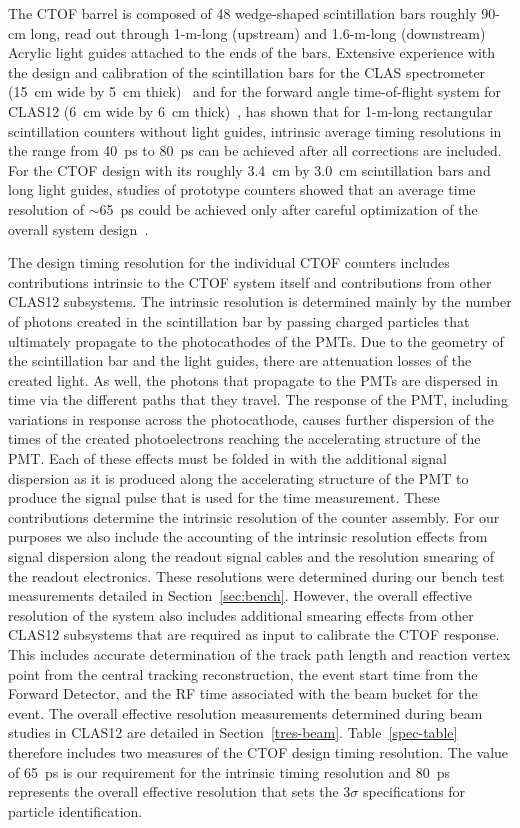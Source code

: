 \documentclass{elsart}
\begin{document}
The CTOF barrel is composed of 48 wedge-shaped scintillation bars roughly 90-cm long, read out
through 1-m-long (upstream) and 1.6-m-long (downstream) Acrylic light guides attached to the 
ends of the bars. Extensive experience with the design and calibration of the scintillation bars for 
the CLAS spectrometer (15~cm wide by 5~cm thick)~\cite{tof-nim} and for the forward angle 
time-of-flight system for CLAS12 (6~cm wide by 6~cm thick)~\cite{ftof-nim}, has shown that for 
1-m-long rectangular scintillation counters without light guides, intrinsic average timing resolutions
in the range from 40~ps to 80~ps can be achieved after all corrections are included. For the CTOF
design with its roughly 3.4~cm by 3.0~cm scintillation bars and long light guides, studies of prototype
counters showed that an average time resolution of $\sim$65~ps could be achieved only after careful
optimization of the overall system design~\cite{baturin-2009}.

The design timing resolution for the individual CTOF counters includes contributions intrinsic to the
CTOF system itself and contributions from other CLAS12 subsystems. The intrinsic resolution
is determined mainly by the number of photons created in the scintillation bar by passing charged
particles that ultimately propagate to the photocathodes of the PMTs. Due to the geometry of the
scintillation bar and the light guides, there are attenuation losses of the created light. As well, the
photons that propagate to the PMTs are dispersed in time via the different paths that they travel.
The response of the PMT, including variations in response across the photocathode, causes further
dispersion of the times of the created photoelectrons reaching the accelerating structure of the PMT.
Each of these effects must be folded in with the additional signal dispersion as it is produced along the
accelerating structure of the PMT to produce the signal pulse that is used for the time measurement.
These contributions determine the intrinsic resolution of the counter assembly. For our purposes we also
include the accounting of the intrinsic resolution effects from signal dispersion along the readout signal
cables and the resolution smearing of the readout electronics. These resolutions were determined during
our bench test measurements detailed in Section~\ref{sec:bench}. However, the overall effective resolution
of the system also includes additional smearing effects from other CLAS12 subsystems that are required
as input to calibrate the CTOF response. This includes accurate determination of the track path length and
reaction vertex point from the central tracking reconstruction, the event start time from the Forward
Detector, and the RF time associated with the beam bucket for the event. The overall effective resolution
measurements determined during beam studies in CLAS12 are detailed in Section~\ref{tres-beam}.
Table~\ref{spec-table} therefore includes two measures of the CTOF design timing resolution. The value
of 65~ps is our requirement for the intrinsic timing resolution and 80~ps represents the overall effective
resolution that sets the 3$\sigma$ specifications for particle identification.
\end{document}
